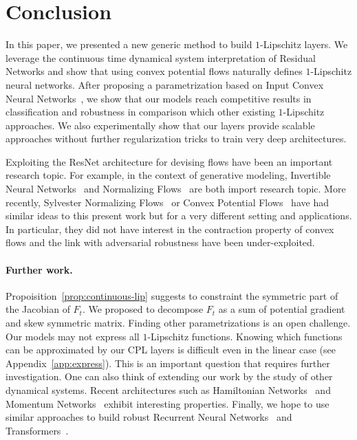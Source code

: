 \section{Conclusion}
In this paper, we presented a new generic method to build $1$-Lipschitz layers.
We leverage the continuous time dynamical system interpretation of Residual Networks and show that using convex potential flows naturally defines $1$-Lipschitz neural networks.
After proposing a parametrization based on Input Convex Neural Networks~\citep{amos2017input}, we  show that our models  reach competitive results in classification and robustness in comparison which other existing $1$-Lipschitz approaches.
We also experimentally show that our layers provide scalable approaches without further regularization tricks to train very deep architectures.

Exploiting the ResNet architecture for devising flows have been an important research topic.
For example, in the context of generative modeling, Invertible Neural Networks~\citep{behrmann2019invertible} and Normalizing Flows~\citep{rezende2015variational, verine2021expressivity} are both import research topic.
More recently, Sylvester Normalizing Flows~\citep{vdberg2018sylvester} or Convex Potential Flows~\citep{huang2021convex} have had similar ideas to this present work but for a very different setting and applications. In particular, they did not have interest in the contraction property of convex flows and the link with adversarial robustness have been under-exploited.


\paragraph{Further work.}
Propoisition~\ref{prop:continuous-lip} suggests to constraint the symmetric part of the Jacobian of $F_t$. We proposed to decompose $F_t$ as a sum of potential gradient and skew symmetric matrix. Finding other parametrizations is an open challenge.
Our models may not express all $1$-Lipschitz functions.
Knowing which functions can be approximated by our CPL layers is difficult even in the linear case (see Appendix~\ref{app:express}). This is  an important question that requires further investigation. 
One can also think of extending  our work by the study of  other dynamical systems. Recent architectures such as Hamiltonian Networks~\citep{greydanus2019hamiltonian} and Momentum Networks~\citep{sander2021momentum} exhibit interesting properties.
Finally, we hope to use similar approaches to build robust Recurrent Neural Networks~\citep{sherstinsky2020fundamentals} and Transformers~\citep{vaswani2017attention}.



